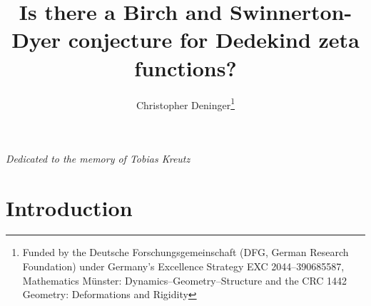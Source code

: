 \documentclass[12pt,leqno]{article}
\begin{document}
\title{Is there a Birch and Swinnerton-Dyer conjecture for Dedekind zeta functions?}
\author{Christopher Deninger\footnote{Funded by the Deutsche Forschungsgemeinschaft (DFG, German Research Foundation) under Germany's Excellence Strategy EXC 2044--390685587, Mathematics M\"unster: Dynamics--Geometry--Structure and the CRC 1442 Geometry: Deformations and Rigidity}}
\date{}
\maketitle
\centerline{\textit{Dedicated to the memory of Tobias Kreutz}}


%
\section{Introduction}
\end{document}
